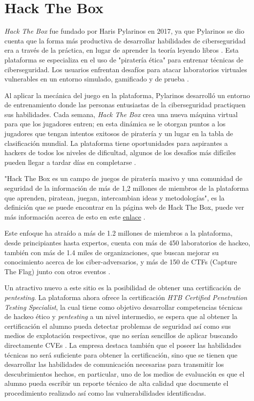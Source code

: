 \documentclass{article}
\begin{document}
    \section{Hack The Box}

        \emph{Hack The Box} fue fundado por Haris Pylarinos en 2017, ya que Pylarinos se dio cuenta que la forma más productiva de desarrollar habilidades de ciberseguridad era a través de la práctica, en lugar de aprender la teoría leyendo libros \cite{novick_2019}. Esta plataforma se especializa en el uso de "piratería ética" para entrenar técnicas de ciberseguridad. Los usuarios enfrentan desafíos para atacar laboratorios virtuales vulnerables en un entorno simulado, gamificado y de prueba \cite{butcher_2021}.

        Al aplicar la mecánica del juego en la plataforma, Pylarinos desarrolló un entorno de entrenamiento donde las personas entusiastas de la ciberseguridad practiquen sus habilidades. Cada semana, \emph{Hack The Box} crea una nueva máquina virtual para que los jugadores entren; en esta dinámica se le otorgan puntos a los jugadores que tengan intentos exitosos de piratería y un lugar en la tabla de clasificación mundial. La plataforma tiene oportunidades para aspirantes a hackers de todos los niveles de dificultad, algunos de los desafíos más difíciles pueden llegar a tardar días en completarse \cite{novick_2019}.

        "Hack The Box es un campo de juegos de piratería masivo y una comunidad de seguridad de la información de más de 1,2 millones de miembros de la plataforma que aprenden, piratean, juegan, intercambian ideas y metodologías", es la definición que se puede encontrar en la página web de Hack The Box, puede ver más información acerca de esto en este \href{https://www.hackthebox.com/about-us}{enlace} \cite{hack}.

        Este enfoque ha atraído a más de 1.2 millones de miembros a la plataforma, desde principiantes hasta expertos, cuenta con más de 450 laboratorios de hackeo, también con más de 1.4 miles de organizaciones, que buscan mejorar su conocimiento acerca de los ciber-adversarios, y más de 150 de CTFs (Capture The Flag) junto con otros eventos \cite{hack}.

        Un atractivo nuevo a este sitio es la posibilidad de obtener una certificación de \emph{pentesting}. La plataforma ahora ofrece la certificación \emph{HTB Certified Penetration Testing Specialist}, la cual tiene como objetivo desarrollar competencias técnicas de hackeo ético y \emph{pentesting} a un nivel intermedio, se espera que al obtener la certificación el alumno pueda detectar problemas de seguridad así como sus medios de explotación respectivos, que no serían sencillos de aplicar buscando directamente CVEs \cite{htb-cert-info}. La empresa destaca también que el poseer las habilidades técnicas no será suficiente para obtener la certificación, sino que se tienen que desarrollar las habilidades de comunicación necesarias para transmitir los descubrimientos hechos, en particular, uno de los medios de evaluación es que el alumno pueda escribir un reporte técnico de alta calidad que documente el procedimiento realizado así como las vulnerabilidades identificadas.
\end{document}
